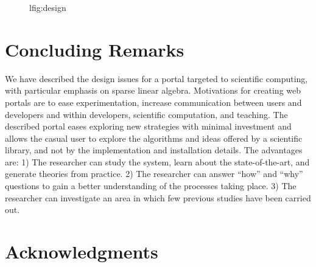 \documentclass[11pt,relax]{SANDreport}
\begin{document}
\begin{figure}
\begin{center}
l{fig:design}
\end{center}
\end{figure}

\section{Concluding Remarks}
\label{sec:concluding}

We have described the design issues for a portal targeted to scientific
computing, with particular emphasis on sparse linear algebra. Motivations for
creating web portals are to ease experimentation, increase communication
between users and developers and within developers, scientific computation,
        and teaching. The described portal 
eases exploring new strategies with minimal investment and allows the
casual user to explore the algorithms and ideas offered by a scientific
library, and not by the implementation and installation details.
The advantages are:
1) The researcher can study the system, learn about the state-of-the-art, and
generate theories from practice. 2) The researcher can answer ``how'' and
``why'' questions to gain a better understanding of the processes taking
place. 3) The researcher can investigate an area in which few previous studies
have been carried out.

\section*{Acknowledgments}




\end{document}
